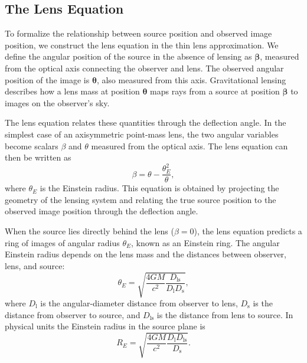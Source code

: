 \subsection{The Lens Equation}
\label{sec:lens_equation}

To formalize the relationship between source position and observed image position, we construct the lens equation in the thin lens approximation. We define the angular position of the source in the absence of lensing as $\boldsymbol{\beta}$, measured from the optical axis connecting the observer and lens. The observed angular position of the image is $\boldsymbol{\theta}$, also measured from this axis. Gravitational lensing describes how a lens mass at position $\boldsymbol{\theta}$ maps rays from a source at position $\boldsymbol{\beta}$ to images on the observer's sky.

The lens equation relates these quantities through the deflection angle. In the simplest case of an axisymmetric point-mass lens, the two angular variables become scalars $\beta$ and $\theta$ measured from the optical axis. The lens equation can then be written as
\begin{equation}
  \beta = \theta - \frac{\theta_E^2}{\theta},
  \label{eq:lens_eq}
\end{equation}
where $\theta_E$ is the Einstein radius. This equation is obtained by projecting the geometry of the lensing system and relating the true source position to the observed image position through the deflection angle.

When the source lies directly behind the lens ($\beta=0$), the lens equation predicts a ring of images of angular radius $\theta_E$, known as an Einstein ring. The angular Einstein radius depends on the lens mass and the distances between observer, lens, and source:
\begin{equation}
  \theta_E = \sqrt{\frac{4 G M}{c^2} \frac{D_{\mathrm{ls}}}{D_{\mathrm{l}} D_{\mathrm{s}}}},
  \label{eq:einstein_ang}
\end{equation}
where $D_{\mathrm{l}}$ is the angular-diameter distance from observer to lens, $D_{\mathrm{s}}$ is the distance from observer to source, and $D_{\mathrm{ls}}$ is the distance from lens to source. In physical units the Einstein radius in the source plane is
\begin{equation}
  R_E = \sqrt{\frac{4 G M}{c^2} \frac{D_{\mathrm{l}} D_{\mathrm{ls}}}{D_{\mathrm{s}}}}.
  \label{eq:einstein_phys}
\end{equation}

